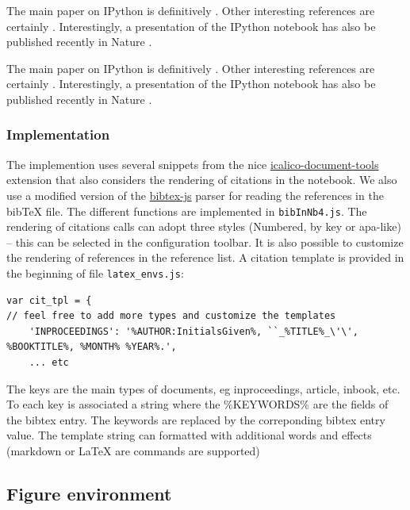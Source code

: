 \begin{listing}
The main paper on IPython is definitively \cite{PER-GRA:2007}. Other interesting references are certainly \cite{mckinney2012python, rossant2013learning}. Interestingly, a presentation of the IPython notebook has also be published recently in Nature \cite{shen2014interactive}.
\end{listing}

The main paper on IPython is definitively \cite{PER-GRA:2007}. Other
interesting references are certainly
\cite{mckinney2012python, rossant2013learning}. Interestingly, a
presentation of the IPython notebook has also be published recently in
Nature \cite{shen2014interactive}.

    \subsubsection{Implementation}\label{implementation}

    The implemention uses several snippets from the nice
\href{https://bitbucket.org/ipre/calico/downloads/}{icalico-document-tools}
extension that also considers the rendering of citations in the
notebook. We also use a modified version of the
\href{https://code.google.com/p/bibtex-js/}{bibtex-js} parser for
reading the references in the bibTeX file. The different functions are
implemented in \texttt{bibInNb4.js}. The rendering of citations calls
can adopt three styles (Numbered, by key or apa-like) -- this can be
selected in the configuration toolbar. It is also possible to customize
the rendering of references in the reference list. A citation template
is provided in the beginning of file \texttt{latex\_envs.js}:

\begin{verbatim}
var cit_tpl = {
// feel free to add more types and customize the templates
    'INPROCEEDINGS': '%AUTHOR:InitialsGiven%, ``_%TITLE%_\'\', %BOOKTITLE%, %MONTH% %YEAR%.',
    ... etc
\end{verbatim}

The keys are the main types of documents, eg inproceedings, article,
inbook, etc. To each key is associated a string where the \%KEYWORDS\%
are the fields of the bibtex entry. The keywords are replaced by the
correponding bibtex entry value. The template string can formatted with
additional words and effects (markdown or LaTeX are commands are
supported)

    \subsection{Figure environment}\label{figure-environment}


